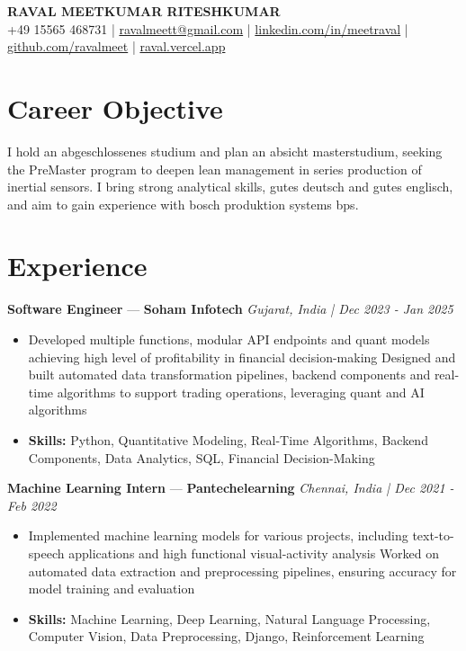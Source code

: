 \documentclass[a4paper,10pt]{article}
\begin{document}
\begin{center}
  {\Large\bfseries RAVAL MEETKUMAR RITESHKUMAR}\\[2pt]
  {\small +49 15565 468731 \;|\; \href{mailto:ravalmeett@gmail.com}{ravalmeett@gmail.com} \;|\; \href{https://www.linkedin.com/in/meetraval/}{linkedin.com/in/meetraval} \;|\; \href{https://github.com/ravalmeet}{github.com/ravalmeet} \;|\; \href{https://raval.vercel.app/}{raval.vercel.app}}
\end{center}
\vspace{-3pt}

\section*{Career Objective}
I hold an abgeschlossenes studium and plan an absicht masterstudium, seeking the PreMaster program to deepen lean management in series production of inertial sensors. I bring strong analytical skills, gutes deutsch and gutes englisch, and aim to gain experience with bosch produktion systems bps.\par

\section*{Experience}
\textbf{Software Engineer} — \textbf{Soham Infotech} \hfill \textit{Gujarat, India \;|\; Dec 2023 - Jan 2025}\par
\vspace{1pt}
\begin{itemize}
  \item Developed multiple functions, modular API endpoints and quant models achieving high level of profitability in financial decision-making Designed and built automated data transformation pipelines, backend components and real-time algorithms to support trading operations, leveraging quant and AI algorithms
  \item \textbf{Skills:} Python, Quantitative Modeling, Real-Time Algorithms, Backend Components, Data Analytics, SQL, Financial Decision-Making
\end{itemize}
\vspace{3pt}
\textbf{Machine Learning Intern} — \textbf{Pantechelearning} \hfill \textit{Chennai, India \;|\; Dec 2021 - Feb 2022}\par
\vspace{1pt}
\begin{itemize}
  \item Implemented machine learning models for various projects, including text-to-speech applications and high functional visual-activity analysis Worked on automated data extraction and preprocessing pipelines, ensuring accuracy for model training and evaluation
  \item \textbf{Skills:} Machine Learning, Deep Learning, Natural Language Processing, Computer Vision, Data Preprocessing, Django, Reinforcement Learning
\end{itemize}
\end{document}
